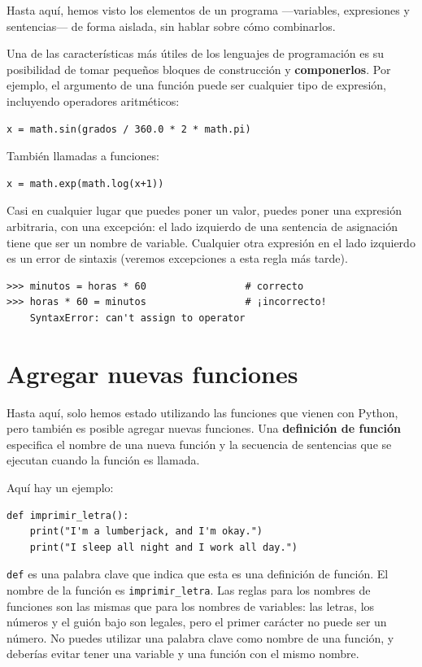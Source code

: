 \documentclass[10pt]{book}
\begin{document}
Hasta aquí, hemos visto los elementos de un programa ---variables,
expresiones y sentencias--- de forma aislada, sin hablar sobre cómo
combinarlos.

Una de las características más útiles de los lenguajes de programación es su
posibilidad de tomar pequeños bloques de construcción y {\bf componerlos}.  Por
ejemplo, el argumento de una función puede ser cualquier tipo de expresión,
incluyendo operadores aritméticos:

\begin{verbatim}
x = math.sin(grados / 360.0 * 2 * math.pi)
\end{verbatim}
%
También llamadas a funciones:

\begin{verbatim}
x = math.exp(math.log(x+1))
\end{verbatim}
%
Casi en cualquier lugar que puedes poner un valor, puedes poner una expresión
arbitraria, con una excepción: el lado izquierdo de una sentencia
de asignación tiene que ser un nombre de variable. Cualquier otra expresión en el lado
izquierdo es un error de sintaxis (veremos excepciones a esta regla
más tarde).

\begin{verbatim}
>>> minutos = horas * 60                 # correcto
>>> horas * 60 = minutos                 # ¡incorrecto!
    SyntaxError: can't assign to operator
\end{verbatim}
%


\section{Agregar nuevas funciones}

Hasta aquí, solo hemos estado utilizando las funciones que vienen con Python,
pero también es posible agregar nuevas funciones.
Una {\bf definición de función} especifica el nombre de una nueva función y
la secuencia de sentencias que se ejecutan cuando la función es llamada.

Aquí hay un ejemplo:

\begin{verbatim}
def imprimir_letra():
    print("I'm a lumberjack, and I'm okay.")
    print("I sleep all night and I work all day.")
\end{verbatim}
%
{\tt def} es una palabra clave que indica que esta es una definición
de función. El nombre de la función es \verb"imprimir_letra".  Las
reglas para los nombres de funciones son las mismas que para los nombres de variables: las letras,
los números y el guión bajo son legales, pero el primer carácter
no puede ser un número.  No puedes utilizar una palabra clave como nombre de una función,
y deberías evitar tener una variable y una función con el mismo
nombre.
\end{document}
